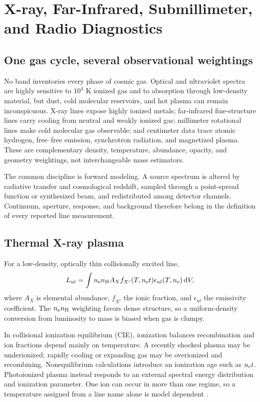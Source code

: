 \chapter{X-ray, Far-Infrared, Submillimeter, and Radio Diagnostics}
\label{chap:multiwavelength}

\section{One gas cycle, several observational weightings}

No band inventories every phase of cosmic gas. Optical and ultraviolet
spectra are highly sensitive to $10^4$ K ionized gas and to absorption through
low-density material, but dust, cold molecular reservoirs, and hot plasma can
remain inconspicuous. X-ray lines expose highly ionized metals; far-infrared
fine-structure lines carry cooling from neutral and weakly ionized gas;
millimeter rotational lines make cold molecular gas observable; and centimeter
data trace atomic hydrogen, free--free emission, synchrotron radiation, and
magnetized plasma. These are complementary density, temperature, abundance,
opacity, and geometry weightings, not interchangeable mass estimators.

The common discipline is forward modeling. A source spectrum is altered by
radiative transfer and cosmological redshift, sampled through a point-spread
function or synthesized beam, and redistributed among detector channels.
Continuum, aperture, response, and background therefore belong in the
definition of every reported line measurement.

\section{Thermal X-ray plasma}

For a low-density, optically thin collisionally excited line,
\begin{equation}
 L_{ul}=\int n_{\rm e}n_{\rm H} A_X f_{X^i}(T,n_{\rm e}t)
 \epsilon_{ul}(T,n_{\rm e})\,{\rm d}V ,
 \label{eq:xray-line}
\end{equation}
where $A_X$ is elemental abundance, $f_{X^i}$ the ionic fraction, and
$\epsilon_{ul}$ the emissivity coefficient. The $n_{\rm e}n_{\rm H}$
weighting favors dense structure, so a uniform-density conversion from
luminosity to mass is biased when gas is clumpy.

In collisional ionization equilibrium (CIE), ionization balances
recombination and ion fractions depend mainly on temperature. A recently
shocked plasma may be underionized; rapidly cooling or expanding gas may be
overionized and recombining. Nonequilibrium calculations introduce an
ionization age such as $n_{\rm e}t$. Photoionized plasma instead responds to
an external spectral energy distribution and ionization parameter. One ion
can occur in more than one regime, so a temperature assigned from a line name
alone is model dependent \citep{Draine2011,SutherlandDopita1993,AtomDB2025}.

